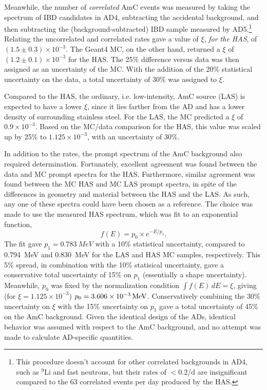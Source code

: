 \documentclass[../thesis.tex]{subfiles}
\begin{document}
Meanwhile, the number of \emph{correlated} AmC events was measured by taking the
spectrum of IBD candidates in AD4, subtracting the accidental background, and
then subtracting the (background-subtracted) IBD sample measured by
AD5.\footnote{This procedure doesn't account for other correlated backgrounds in
  AD4, such as $^9$Li and fast neutrons, but their rates of $< 0.2$/d are
  insignificant compared to the 63 correlated events per day produced by the
  HAS.} Relating the uncorrelated and correlated rates gave a value of $\xi$,
\emph{for the HAS}, of $(1.5\pm0.3)\times10^{-3}$. The Geant4 MC, on the other
hand, returned a $\xi$ of $(1.2\pm0.1)\times10^{-3}$ for the HAS. The 25\%
difference versus data was then assigned as an uncertainty of the MC. With the
addition of the 20\% statistical uncertainty on the data, a total uncertainty of
30\% was assigned to $\xi$.

Compared to the HAS, the ordinary, i.e. low-intensity, AmC source (LAS) is
expected to have a lower $\xi$, since it lies farther from the AD and has a
lower density of surrounding stainless steel. For the LAS, the MC predicted a
$\xi$ of $0.9\times10^{-3}$. Based on the MC/data comparison for the HAS, this
value was scaled up by 25\% to $1.125\times10^{-3}$, with an uncertainty of
30\%.

In addition to the rates, the prompt spectrum of the AmC background also
required determination. Fortunately, excellent agreement was found between the
data and MC prompt spectra for the HAS. Furthermore, similar agreement was found
between the MC HAS and MC LAS prompt spectra, in spite of the differences in
geometry and material between the HAS and the LAS. As such, any one of these
spectra could have been chosen as a reference. The choice was made to use the
measured HAS spectrum, which was fit to an exponential function,
\begin{equation*}
  f(E) = p_0 \times e^{-E/p_1}.
\end{equation*}
The fit gave $p_1 = \SI{0.783}{MeV}$ with a 10\% statistical uncertainty,
compared to \SI{0.794}{MeV} and \SI{0.830}{MeV} for the LAS and HAS MC samples,
respectively. This 5\% spread, in combination with the 10\% statisical
uncertainty, gave a conservative total uncertainty of 15\% on $p_1$ (essentially
a shape uncertainty). Meanwhile, $p_0$ was fixed by the normalization condition
$\int f(E)\,dE = \xi$, giving (for $\xi = 1.125\times10^{-3}$) $p_0 =
\SI[parse-numbers = false]{3.606\times10^{-3}}{/MeV}$. Conservatively combining
the 30\% uncertainty on $\xi$ with the 15\% uncertainty on $p_1$ gave a total
uncertainty of 45\% on the AmC background. Given the identical design of the
ADs, identical behavior was assumed with respect to the AmC background, and no
attempt was made to calculate AD-specific quantities.
\end{document}

